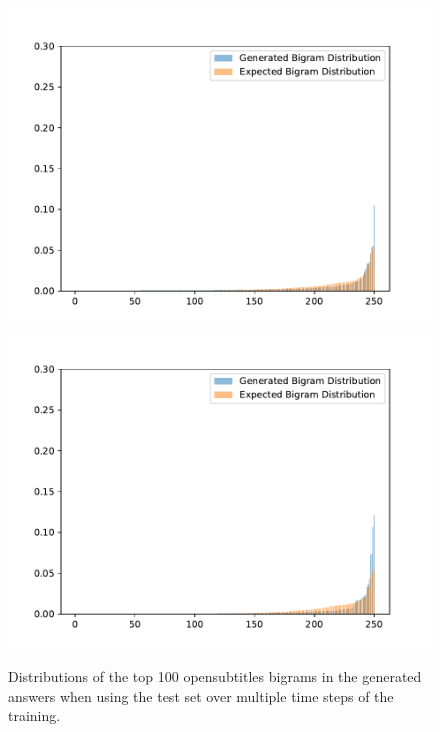 \begin{figure}[H]
	\includegraphics[width=\linewidth]{img/plots/opensubtitles_not_reversed/bigram_distribution_comparison_step_2500000.pdf}
	\centering
	\small
	\endminipage\hfill
	\includegraphics[width=\linewidth]{img/plots/opensubtitles_not_reversed/bigram_distribution_comparison_step_3000000.pdf}
	\centering
	\small
	\endminipage\hfill
	\caption{Distributions of the top 100 opensubtitles bigrams in the generated answers when using the test set over multiple time steps of the training.}
	\label{results:ngram:distributions:opensubtitles}
\end{figure}

